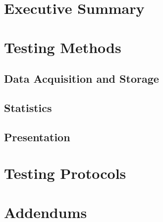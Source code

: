 \documentclass{article}
\begin{document}

\setcounter{tocdepth}{2}
\tableofcontents
\newpage

\listoftables
\listoffigures
\newpage


\section*{Executive Summary}
\label{sec:exec-summary}


\newpage

\section{Testing Methods}
\label{sec:testing-protocols}

\subsection{Data Acquisition and Storage}
\label{sec:data-acqu-stor}

\subsection{Statistics}
\label{sec:statistics}

\subsection{Presentation}
\label{sec:presentation}

\section{Testing Protocols}
\label{sec:protocols}

%
%

\section{Addendums}
\label{sec:addendums}

\newpage
{}


\end{document}
